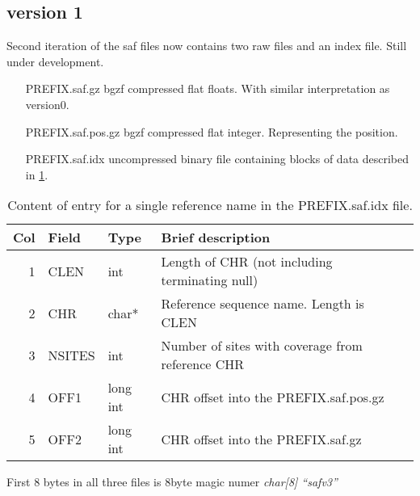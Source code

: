 \documentclass[10pt]{article}
\begin{document}
\subsection{version 1}
Second iteration of the saf files now contains two raw files and an index file. Still under development.
\begin{itemize}
\item[PREFIX.saf.gz] bgzf compressed flat floats. With similar interpretation as version0.
\item[PREFIX.saf.pos.gz] bgzf compressed flat integer. Representing the position.
\item[PREFIX.saf.idx] uncompressed binary file containing blocks of data described in \ref{tab1}.
\end{itemize}
\begin{table}
\begin{tabular}{rllll}
  \hline
  {\bf Col} & {\bf Field} & {\bf Type} & {\bf Brief description} \\
  \hline
  1 & {\sf CLEN} & int &  Length of CHR (not including terminating null)\\
  2 & {\sf CHR} & char* & Reference sequence name. Length is CLEN\\
  3 & {\sf NSITES} & int & Number of sites with coverage from reference CHR\\
  4 & {\sf OFF1} & long int & CHR offset into the PREFIX.saf.pos.gz \\
  5 & {\sf OFF2} & long int & CHR offset into the PREFIX.saf.gz \\
  \hline
\end{tabular}\label{tab1}
\caption{Content of entry for a single reference name in the PREFIX.saf.idx file.}
\end{table}
First 8 bytes in all three files is 8byte magic numer \emph{char[8] ``safv3''}
\end{document}
